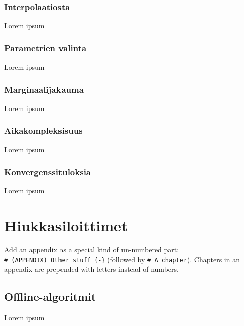\documentclass[
  12pt,
  a4paper, twoside]{book}
\theoremstyle{definition}
\theoremstyle{definition}
\theoremstyle{definition}
\theoremstyle{definition}
\theoremstyle{remark}
\begin{document}
\hypertarget{interpolaatiosta}{%
\subsection{Interpolaatiosta}\label{interpolaatiosta}}

Lorem ipsum

\hypertarget{parametrien-valinta}{%
\subsection{Parametrien valinta}\label{parametrien-valinta}}

Lorem ipsum

\hypertarget{marginaalijakauma}{%
\subsection{Marginaalijakauma}\label{marginaalijakauma}}

Lorem ipsum

\hypertarget{aikakompleksisuus}{%
\subsection{Aikakompleksisuus}\label{aikakompleksisuus}}

Lorem ipsum

\hypertarget{konvergenssituloksia}{%
\subsection{Konvergenssituloksia}\label{konvergenssituloksia}}

Lorem ipsum

\hypertarget{hiukkasiloittimet}{%
\chapter{Hiukkasiloittimet}\label{hiukkasiloittimet}}

Add an appendix as a special kind of un-numbered part: \texttt{\#\ (APPENDIX)\ Other\ stuff\ \{-\}} (followed by \texttt{\#\ A\ chapter}). Chapters in an appendix are prepended with letters instead of numbers.

\hypertarget{offline-algoritmit}{%
\section{Offline-algoritmit}\label{offline-algoritmit}}

Lorem ipsum
\end{document}
